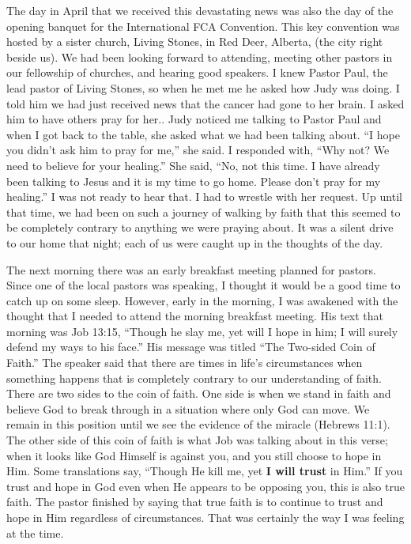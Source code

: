 \documentclass[twoside, 12pt]{book}
\begin{document}
The day in April that we received this devastating news was also the day of the opening banquet for the International FCA Convention. This key convention was hosted by a sister church, Living Stones, in Red Deer, Alberta, (the city right beside us). We had been looking forward to attending, meeting other pastors in our fellowship of churches, and hearing good speakers. I knew Pastor Paul, the lead pastor of Living Stones, so when he met me he asked how Judy was doing. I told him we had just received news that the cancer had gone to her brain. I asked him to have others pray for her.. Judy noticed me talking to Pastor Paul and when I got back to the table, she asked what we had been talking about. “I hope you didn’t ask him to pray for me,” she said. I responded with, “Why not? We need to believe for your healing.” She said, “No, not this time. I have already been talking to Jesus and it is my time to go home. Please don’t pray for my healing.” I was not ready to hear that. I had to wrestle with her request. Up until that time, we had been on such a journey of walking by faith that this seemed to be completely contrary to anything we were praying about. It was a silent drive to our home that night; each of us were caught up in the thoughts of the day.

The next morning there was an early breakfast meeting planned for pastors. Since one of the local pastors was speaking, I thought it would be a good time to catch up on some sleep.  However, early in the morning, I was awakened with the thought that I needed to attend the morning breakfast meeting. His text that morning was Job 13:15, “Though he slay me, yet will I hope in him; I will surely defend my ways to his face.” His message was titled “The Two-sided Coin of Faith.” The speaker said that there are times in life’s circumstances when something happens that is completely contrary to our understanding of faith. There are two sides to the coin of faith. One side is when we stand in faith and believe God to break through in a situation where only God can move. We remain in this position until we see the evidence of the miracle (Hebrews 11:1). The other side of this coin of faith is what Job was talking about in this verse; when it looks like God Himself is against you, and you still choose to hope in Him. Some translations say, “Though He kill me, yet \textbf{I will trust} in Him.” If you trust and hope in God even when He appears to be opposing you, this is also true faith. The pastor finished by saying that true faith is to continue to trust and hope in Him regardless of circumstances. That was certainly the way I was feeling at the time.
\end{document}

